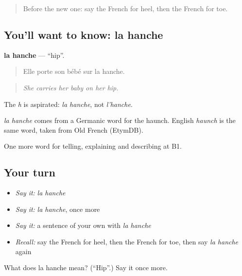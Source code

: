 \label{lesson:FR-C477-hanche}



\begin{quote}
Before the new one: say the French for heel, then the French for toe.
\end{quote}

\subsection*{You'll want to know: la hanche}
\textbf{la hanche} — \textquotedblleft{}hip\textquotedblright{}.

\begin{quote}
Elle porte son bébé sur la hanche.
\end{quote}

\begin{quote}
\emph{She carries her baby on her hip.}
\end{quote}

The \emph{h} is aspirated: \emph{la hanche}, not \emph{l'hanche}.

\begin{cousinweb}
\emph{la hanche} comes from a Germanic word for the haunch. English \emph{haunch} is the same word, taken from Old French (EtymDB).
\end{cousinweb}

\begin{grammarlens}[title={What you've built}]
One more word for telling, explaining and describing at B1.
\end{grammarlens}

\subsection*{Your turn}
\begin{itemize}
\raggedright
  \item \emph{Say it:} \emph{la hanche}
  \item \emph{Say it:} \emph{la hanche}, once more
  \item \emph{Say it:} a sentence of your own with \emph{la hanche}
  \item \emph{Recall:} say the French for heel, then the French for toe, then say \emph{la hanche} again
\end{itemize}

\begin{tcolorbox}[breakable,colback=teal!4,colframe=teal!35!black,title={Before you move on}]
What does la hanche mean? (\textquotedblleft{}Hip\textquotedblright{}.) Say it once more.
\end{tcolorbox}
